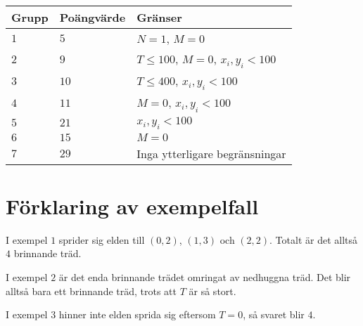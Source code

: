 \noindent
\begin{tabular}{| l | l | l |}
\hline
Grupp & Poängvärde & Gränser \\ \hline
$1$   & $5$        & $N = 1$, $M = 0$ \\ \hline
$2$   & $9$        & $T \leq 100$, $M = 0$, $x_i, y_i < 100$\\ \hline
$3$   & $10$       & $T \leq 400$, $x_i, y_i < 100$ \\ \hline
$4$   & $11$       & $M = 0$, $x_i, y_i < 100$ \\ \hline
$5$   & $21$       & $x_i, y_i < 100$ \\ \hline
$6$   & $15$       & $M = 0$ \\ \hline
$7$   & $29$       & Inga ytterligare begränsningar \\ \hline
\end{tabular}

\section*{Förklaring av exempelfall}
I exempel $1$ sprider sig elden till $(0,2)$, $(1,3)$ och $(2,2)$. Totalt är det alltså $4$ brinnande träd.

I exempel $2$ är det enda brinnande trädet omringat av nedhuggna träd. Det blir alltså bara ett brinnande träd, trots att $T$ är så stort.

I exempel $3$ hinner inte elden sprida sig eftersom $T = 0$, så svaret blir $4$.
